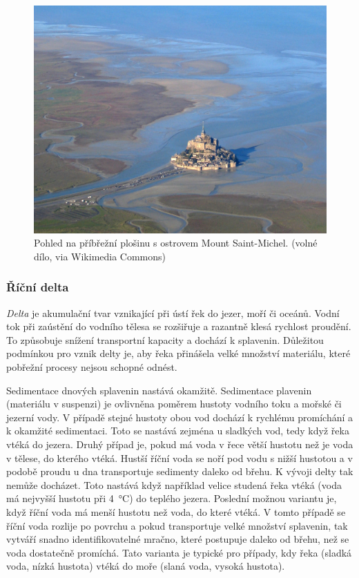 \begin{figure}[h]
	\centering
	\includegraphics[width=1\linewidth]{obrazky/marine/watty}
	\caption{Pohled na příbřežní plošinu s ostrovem Mount Saint-Michel. (volné dílo, via Wikimedia Commons)}
	\label{fig:watty}
\end{figure}

\subsubsection{Říční delta}
\emph{Delta} je akumulační tvar vznikající při ústí řek do jezer, moří či oceánů. Vodní tok při zaústění do vodního tělesa se rozšiřuje a razantně klesá rychlost proudění. To způsobuje snížení transportní kapacity a dochází k splavenin. Důležitou podmínkou pro vznik delty je, aby řeka přinášela velké množství materiálu, které pobřežní procesy nejsou schopné odnést. 

Sedimentace dnových splavenin nastává okamžitě. Sedimentace plavenin (materiálu v suspenzi) je ovlivněna poměrem hustoty vodního toku a mořské či jezerní vody. V případě stejné hustoty obou vod dochází k rychlému promíchání a k okamžité sedimentaci. Toto se nastává zejména u sladkých vod, tedy když řeka vtéká do jezera. Druhý případ je, pokud má voda v řece větší hustotu než je voda v tělese, do kterého vtéká. Hustší říční voda se noří pod vodu s nižší hustotou a v podobě proudu u dna transportuje sedimenty daleko od břehu. K vývoji delty tak nemůže docházet. Toto nastává když například velice studená řeka vtéká (voda má nejvyšší hustotu při \SI{4}{\celsius}) do teplého jezera. Poslední možnou variantu je, když říční voda má menší hustotu než voda, do které vtéká. V tomto případě se říční voda rozlije po povrchu a pokud transportuje velké množství splavenin, tak vytváří snadno identifikovatelné mračno, které postupuje daleko od břehu, než se voda dostatečně promíchá. Tato varianta je typické pro případy, kdy řeka (sladká voda, nízká hustota) vtéká do moře (slaná voda, vysoká hustota).


